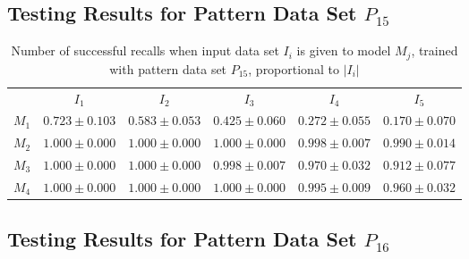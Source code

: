 \documentclass[anon]{CI}
\begin{document}
		\subsection{Testing Results for Pattern Data Set $P_{15}$}
		
		
		\begin{table}[H]
			\centering
			\def\arraystretch{1.5}
			\footnotesize
			\begin{tabular}{cccccc}
				
				& $I_{1}$  & $I_{2}$  & $I_{3}$  & $I_{4}$  & $I_{5}$ \\ \cline{2-6}
				$M_{1}$  & $0.723\pm0.103$  & $0.583\pm0.053$  & $0.425\pm0.060$  & $0.272\pm0.055$  & $0.170\pm0.070$ \\
				$M_{2}$  & $1.000\pm0.000$  & $1.000\pm0.000$  & $1.000\pm0.000$  & $0.998\pm0.007$  & $0.990\pm0.014$ \\
				$M_{3}$  & $1.000\pm0.000$  & $1.000\pm0.000$  & $0.998\pm0.007$  & $0.970\pm0.032$  & $0.912\pm0.077$ \\
				$M_{4}$  & $1.000\pm0.000$  & $1.000\pm0.000$  & $1.000\pm0.000$  & $0.995\pm0.009$  & $0.960\pm0.032$ \\
				
			\end{tabular}
			\caption{Number of successful recalls when input data set $I_i$ is given to model $M_j$, trained with pattern data set $P_{15}$, proportional to $\left|I_i\right|$}
		\end{table}
		
		\subsection{Testing Results for Pattern Data Set $P_{16}$}
		
		
\end{document}
